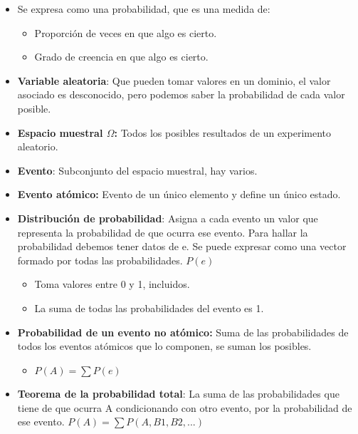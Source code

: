 \documentclass[12pt, twoside, openright]{report} %
\begin{document}
  \begin{itemize}
  \item Se expresa como una probabilidad, que es una medida de:
    

    \begin{itemize}
    \item Proporción de veces en que algo es cierto.
      
    \item Grado de creencia en que algo es cierto.
      
    \end{itemize}
  \item \textbf{Variable aleatoria}: Que pueden tomar valores en un dominio,
    el valor asociado es desconocido, pero podemos saber la probabilidad
    de cada valor posible.
    
  \item \textbf{Espacio muestral $\Omega$:} Todos los posibles resultados de un
    experimento aleatorio.
    
  \item \textbf{Evento}: Subconjunto del espacio muestral, hay varios.
    
  \item \textbf{Evento atómico:} Evento de un único elemento y define un
    único estado.
    
  \item \textbf{Distribución de probabilidad}: Asigna a cada evento un valor
    que representa la probabilidad de que ocurra ese evento. Para hallar
    la probabilidad debemos tener datos de e. Se puede expresar como una
    vector formado por todas las probabilidades. $P(e)$
    

    \begin{itemize}
    \item Toma valores entre 0 y 1, incluidos.
      
    \item La suma de todas las probabilidades del evento es 1.
      
    \end{itemize}
  \item \textbf{Probabilidad de un evento no atómico:} Suma de las
    probabilidades de todos los eventos atómicos que lo componen, se
    suman los posibles.
    

    \begin{itemize}
    \item \textbf{$P(A)=\sum\limits P(e)$}
      
    \end{itemize}
  \item \textbf{Teorema de la probabilidad total}: La suma de las
    probabilidades que tiene de que ocurra A condicionando con otro
    evento, por la probabilidad de ese evento. \textbf{$P(A)=\sum\limits P(A, B1,B2,...)$}
    

\end{itemize}
\end{document}
